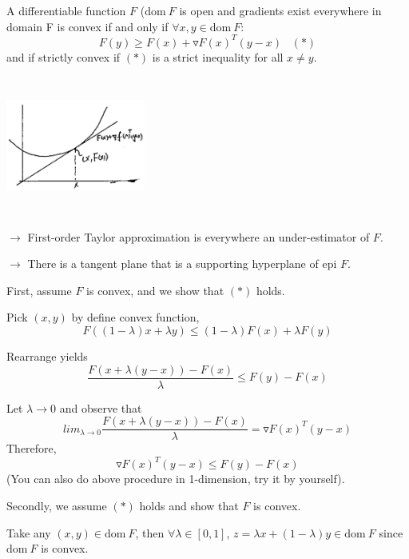 \begin{theorem}
	A differentiable function $F$ ($\text{dom}\ F$ is open and gradients exist everywhere in domain F is convex if and only if $\forall x,y\in \text{dom}\ F$:
	\begin{equation*}
	F(y)\geq F(x) + \triangledown F(x)^T(y-x) \,\,\,\,\,  (*)
	\end{equation*}
	and if strictly convex if $(*)$ is a strict inequality for all $x\neq y$.
	
	\begin{marginfigure}
	\centering
	\includegraphics[width=1.8in,height=1.8in]{figures/ch08/figure1106_1.png}
	\end{marginfigure}
	
	$\rightarrow$ First-order Taylor approximation is everywhere an under-estimator of $F$.
	
	$\rightarrow$ There is a tangent plane that is a supporting hyperplane of epi $F$.
\end{theorem}

First, assume $F$ is convex, and we show that $(*)$ holds. 

Pick $(x,y)$ by define convex function,
$$F((1-\lambda)x+\lambda y) \leq (1-\lambda)F(x) + \lambda F(y)$$

Rearrange yields
$$\frac{F(x+\lambda(y-x)) - F(x)}{\lambda} \leq F(y) - F(x)$$

Let $\lambda \rightarrow 0$ and observe that
$$lim_{\lambda\rightarrow 0} \frac{F(x+\lambda(y-x)) - F(x)}{\lambda} = \triangledown F(x)^T(y-x)$$
Therefore,
$$\triangledown F(x)^T(y-x)\leq F(y) - F(x)$$
(You can also do above procedure in 1-dimension, try it by yourself).



Secondly, we assume $(*)$ holds and show that $F$ is convex.

Take any $(x,y)\in \text{dom}\ F$, then $\forall \lambda\in[0,1]$, $z= \lambda x + (1-\lambda)y \in \text{dom}\ F$ since $\text{dom}\ F$ is convex.

